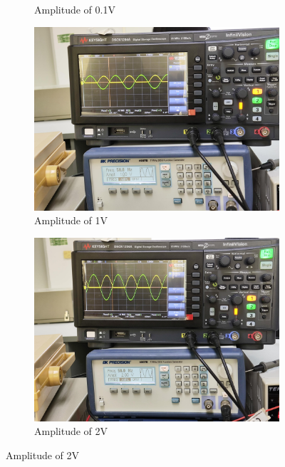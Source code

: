 \begin{itemize}
\begin{figure}[H]
\begin{subfigure}{0.3\textwidth}
                \caption{Amplitude of 0.1V}
                \label{l120wf1}
            \end{subfigure}
            \begin{subfigure}{0.3\textwidth}
                \centering
                \includegraphics[width=1\linewidth]{Experiment_12/Images/RetA 50-1-min.jpg}
                \caption{Amplitude of 1V}
                \label{l121wf1}
            \end{subfigure}
            \begin{subfigure}{0.3\textwidth}
                \centering
                \includegraphics[width=1\linewidth]{Experiment_12/Images/RetA 50-2-min.jpg}
                \caption{Amplitude of 2V}
                \label{l122wf1}
            \end{subfigure}


\end{figure}
\end{itemize}
